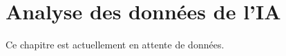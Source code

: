 \chapter{Analyse des données de l'IA}


\begin{info}
	Ce chapitre est actuellement en attente de données.
\end{info}


